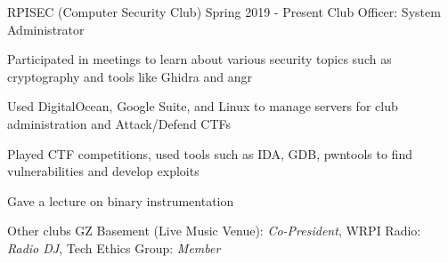 \begin{cventries}
    \cvclub
    {RPISEC (Computer Security Club)}
    {Spring 2019 - Present}
    {Club Officer: System Administrator}
    {
      \begin{cvitems}
            \item {Participated in meetings to learn about various security topics such as cryptography and tools like Ghidra and angr}
            \item {Used DigitalOcean, Google Suite, and Linux to manage servers for club administration and Attack/Defend CTFs}
            \item {Played CTF competitions, used tools such as IDA, GDB, pwntools to find vulnerabilities and develop exploits}
            \item {Gave a lecture on binary instrumentation}
      \end{cvitems}
    }
    
  \cvskilltwo
    {Other clubs}
    {GZ Basement (Live Music Venue): \textit{Co-President}, WRPI Radio: \textit{Radio DJ}, Tech Ethics Group: \textit{Member}}
\end{cventries}